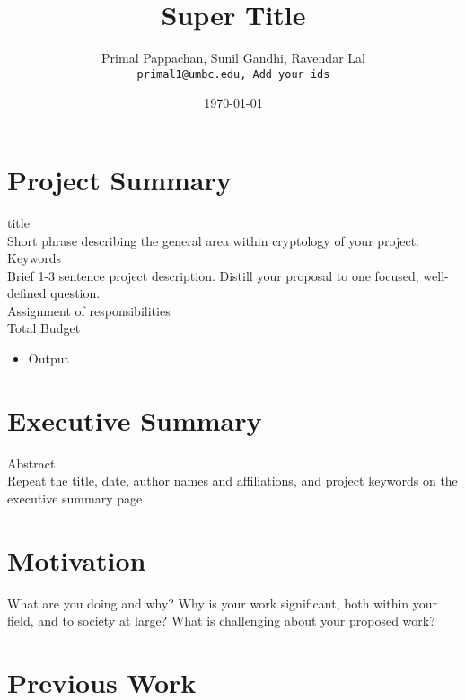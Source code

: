 \documentclass[a4paper,11pt]{article}
\begin{document}

\title{Super Title}
\author{Primal Pappachan, Sunil Gandhi, Ravendar Lal \\ 
\texttt{primal1@umbc.edu, Add your ids}}
\date{\today}
\maketitle


\section{Project Summary}

title \\
Short phrase describing the general area within cryptology of your project. \\
Keywords \\
Brief 1-3 sentence project description. Distill your proposal to one focused, well-defined question. \\
Assignment of responsibilities \\
Total Budget \\


\begin{itemize}
\item Output
\end{itemize}


\section{Executive Summary}

Abstract \\

Repeat the title, date,
author names and affiliations, and project keywords on the executive summary page


\section{Motivation}


What are you doing and why? Why is your work significant, both within your field, and to society at
large? What is challenging about your proposed work?


\section{Previous Work}
\end{document}
